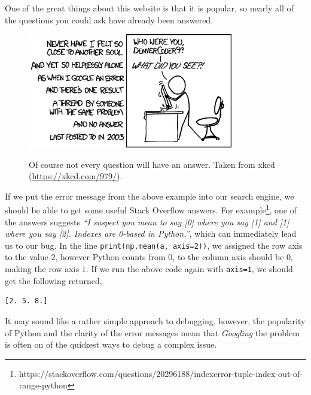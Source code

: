 \documentclass[a4paper]{article}
\begin{document}
One of the great things about this website is that it is popular, so nearly all of the questions you could ask have already been answered.
%
\begin{figure}[t]
\centering
\includegraphics[width=0.8\textwidth]{wisdom_of_the_ancients}
\label{fig:wisdow}
\caption{Of course not every question will have an answer. Taken from xkcd (\url{https://xkcd.com/979/}).}
\end{figure}
%

If we put the error message from the above example into our search engine, we should be able to get some useful Stack Overflow answers.
For example\footnote{https://stackoverflow.com/questions/20296188/indexerror-tuple-index-out-of-range-python}, one of the answers suggests \emph{``I suspect you mean to say [0] where you say [1] and [1] where you say [2]. Indexes are 0-based in Python.''}, which can immediately lead us to our bug.
In the line \texttt{print(np.mean(a, axis=2))}, we assigned the row axis to the value $2$, however Python counts from $0$, to the column axis should be $0$, making the row axis $1$.
If we run the above code again with \texttt{axis=1}, we should get the following returned,
\begin{lstlisting}
[2. 5. 8.]
\end{lstlisting}
It may sound like a rather simple approach to debugging, however, the popularity of Python and the clarity of the error messages mean that \emph{Googling} the problem is often on of the quickest ways to debug a complex issue.
\end{document}
